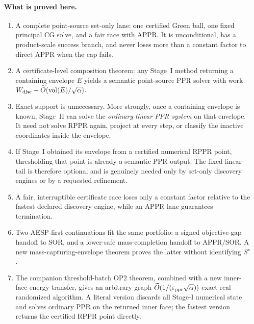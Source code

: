 \paragraph{What is proved here.}
\begin{enumerate}[leftmargin=2.2em]
\item A complete point-source set-only lane: one certified Green ball, one
  fixed principal CG solve, and a fair race with APPR.  It is unconditional,
  has a product-scale success branch, and never loses more than a constant
  factor to direct APPR when the cap fails.
\item A certificate-level composition theorem: any Stage~I method returning
  a containing envelope $E$ yields a semantic point-source PPR solver with
  work
  $W_{\rm disc}+\widetilde O(\operatorname{vol}(E)/\sqrt\alpha)$.
\item Exact support is unnecessary.  More strongly, once a containing
  envelope is known, Stage~II can solve the \emph{ordinary linear PPR system}
  on that envelope.  It need not solve RPPR again, project at every step, or
  classify the inactive coordinates inside the envelope.
\item If Stage~I obtained its envelope from a certified numerical RPPR point,
  thresholding that point is already a semantic PPR output.  The fixed linear
  tail is therefore optional and is genuinely needed only by set-only
  discovery engines or by a requested refinement.
\item A fair, interruptible certificate race loses only a constant factor
  relative to the fastest declared discovery engine, while an APPR lane
  guarantees termination.
\item Two AESP-first continuations fit the same portfolio: a signed
  objective-gap handoff to SOR, and a lower-safe mass-completion handoff to
  APPR/SOR.  A new mass-capturing-envelope theorem proves the latter without
  identifying $S^\star$.
\item The companion threshold-batch OP2 theorem, combined with a new
  inner-face energy transfer, gives an arbitrary-graph
  $\widetilde O(1/(\varepsilon_{\mathrm{ppr}}\sqrt\alpha))$ exact-real randomized algorithm.
  A literal version discards all Stage-I numerical state and solves ordinary
  PPR on the returned inner face; the fastest version returns the certified
  RPPR point directly.
\end{enumerate}

